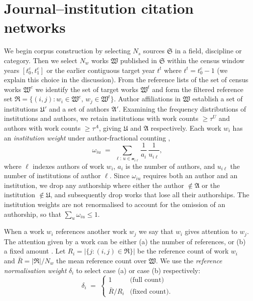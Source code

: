 \section{Journal--institution citation networks}
\label{sec:networks}

We begin corpus construction by selecting $N_s$ sources $\mathfrak{S}$ in a field, discipline or category.
Then we select $N_w$ works $\mathfrak{W}$ published in $\mathfrak{S}$ within the census
window years $[t^c_0,t^c_1]$ or the earlier contiguous target year $t^t$
where $t^t = t^c_0 - 1$ (we explain this choice in the discussion).
From the reference lists of the set of census works $\mathfrak{W}^c$ we identify the set of target works $\mathfrak{W}^t$ and form the filtered reference set $\mathfrak{R}=\{(i,j):w_i\in\mathfrak{W}^c,\,w_j\in\mathfrak{W}^t\}$.
Author affiliations in $\mathfrak{W}$ establish a set of institutions $\mathfrak{U}'$ and a set of
authors $\mathfrak{A}'$. Examining the frequency distributions of institutions and authors, we retain institutions with work counts $\geq\tau^U$ and authors with work counts $\geq\tau^A$, giving $\mathfrak{U}$ and $\mathfrak{A}$ respectively.
Each work $w_i$ has an \textit{institution weight} under author-fractional counting
\citep{waltmanFieldnormalizedCitationImpact2015},
\begin{equation}
  \omega_{i u} \;=\;
  \sum_{\ell:\,u\in\mathcal{u}_{i\ell}}
  \frac{1}{a_i}\,\frac{1}{u_{i\ell}},
  \label{eq:omega}
\end{equation}
where $\ell$ indexes authors of work $w_i$, $a_i$ is the number of authors, and $u_{i\ell}$ the number of
institutions of author $\ell$. Since $\omega_{iu}$ requires both an author and an institution, we drop any authorship where either the author $\notin\mathfrak{A}$ or the institution $\notin\mathfrak{U}$, and subsequently drop works that lose all their authorships. The institution weights are not renormalised to account for the omission of an authorship, so that $\sum_u\omega_{iu}\leq 1$.

When a work $w_i$ references another work $w_j$ we say that $w_i$ gives attention to $w_j$. The attention given by a work can be either (a) the number of references, or (b) a fixed amount \citep{zittModifyingJournalImpact2008}. Let $R_i=|\{j:(i,j)\in\mathfrak{R}\}|$ be the reference count of work $w_i$ and $\bar{R}=|\mathfrak{R}|/N_w$ the mean reference count over $\mathfrak{W}$. We use the \textit{reference normalisation weight} $\delta_i$ to select case (a) or case (b) respectively:
\begin{equation}
	\delta_i \;=\;
	\begin{cases}
		 1 & \text{(full count)} \\
		\bar{R}/R_i & \text{(fixed count).}
	\end{cases}
	\label{eq:delta}
\end{equation}

